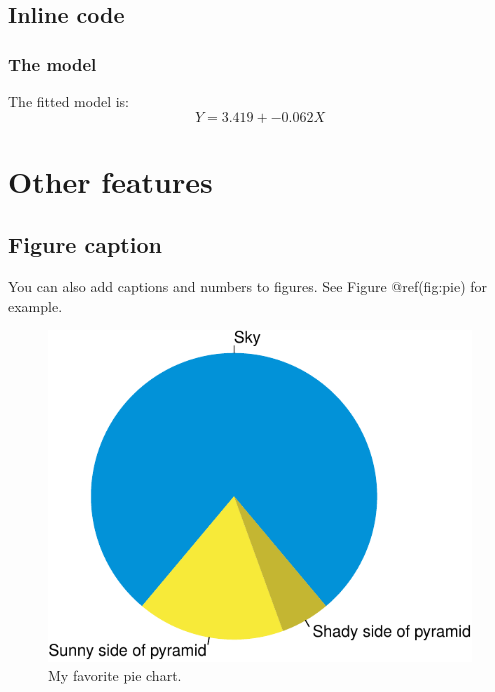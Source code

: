 \documentclass[
]{jss}
\begin{document}
\hypertarget{inline-code}{%
\subsection{Inline code}\label{inline-code}}

\hypertarget{the-model}{%
\subsubsection{The model}\label{the-model}}

The fitted model is: \[Y = 3.419 + -0.062X\]

\hypertarget{other-features}{%
\section{Other features}\label{other-features}}

\hypertarget{figure-caption}{%
\subsection{Figure caption}\label{figure-caption}}

You can also add captions and numbers to figures. See Figure
@ref(fig:pie) for example.

\begin{CodeChunk}

\begin{figure}

{\centering \includegraphics{2020-rstudio-conf-rmarkdown-demo_files/9/pie-1} 

}

\caption[My favorite pie chart]{My favorite pie chart.}\label{fig:pie}
\end{figure}
\end{CodeChunk}
\end{document}
